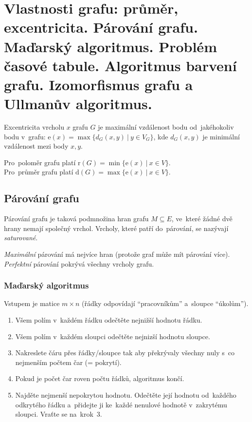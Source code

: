 \clearpage
\section{Vlastnosti grafu: průměr, excentricita. Párování grafu. Maďarský algoritmus. Problém časové tabule. Algoritmus barvení grafu. Izomorfismus grafu a Ullmanův algoritmus.}

Excentricita vrcholu $x$ grafu $G$ je maximální vzdálenost bodu od~jakéhokoliv bodu v~grafu: $\mathrm{e}(x) = \max\{ d_G(x, y) \ |\ y \in V_G\}$, kde $d_G(x,y)$ je minimální vzdálenost mezi body $x, y$.

{}Pro~poloměr grafu platí $\mathrm{r}(G) = \min\{ \mathrm{e}(x)\ |\ x \in V \}$.
\\Pro~průměr grafu platí $\mathrm{d}(G) = \max\{ \mathrm{e}(x)\ |\ x \in V \}$.

\subsection{Párování grafu}

Párování grafu je taková podmnožina hran grafu $M \subseteq E$, ve~které žádné dvě hrany nemají společný vrchol.
Vrcholy, které patří do~párování, se nazývají \emph{saturované}.

{}\emph{Maximální} párování má nejvíce hran (protože graf může mít párování více).
\\\emph{Perfektní} párování pokrývá všechny vrcholy grafu.

\subsubsection{Maďarský algoritmus}

Vstupem je matice $m \times n$ (řádky odpovídají \enquote{pracovníkům} a~sloupce \enquote{úkolům}).

\begin{enumerate}
    \item Všem polím v~každém řádku odečtěte nejnižší hodnotu řádku.
    \item Všem polím v~každém sloupci odečtěte nejnizší hodnotu sloupce.
    \item Nakreslete čáru přes řádky/sloupce tak aby překrývaly všechny nuly s~co nejmenším počtem čar (= pokrytí).
    \item Pokud je počet čar roven počtu řádků, algoritmus končí.
    \item Najděte nejmenší nepokrytou hodnotu. Odečtěte její hodnotu od~každého odkrytého řádku a~přidejte ji ke~každé nenulové hodnotě v~zakrytému sloupci. Vraťte se na~krok~3.
\end{enumerate}


